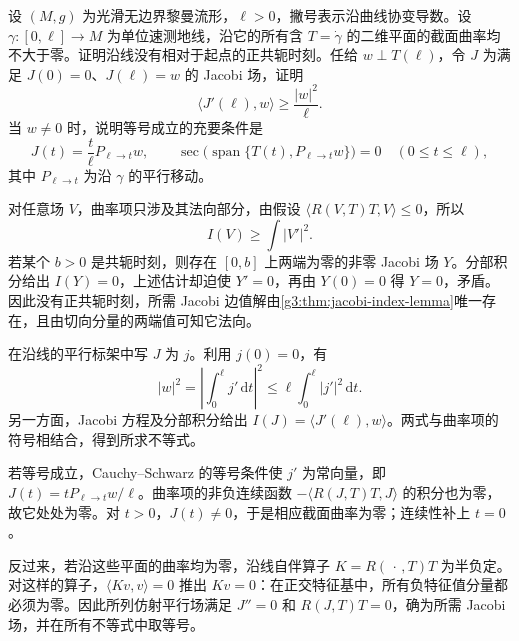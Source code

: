 \begin{exercise}\label{g3:ex:nonpositive-curvature-index-bound}
	设 \((M,g)\) 为光滑无边界黎曼流形，\(\ell>0\)，撇号表示沿曲线协变导数。设 \(\gamma:[0,\ell]\to M\) 为单位速测地线，沿它的所有含 \(T=\dot\gamma\) 的二维平面的截面曲率均不大于零。证明沿线没有相对于起点的正共轭时刻。任给 \(w\perp T(\ell)\)，令 \(J\) 为满足 \(J(0)=0\)、\(J(\ell)=w\) 的 Jacobi 场，证明
	\[
		\langle J'(\ell),w\rangle\ge\frac{|w|^2}{\ell}.
	\]
	当 \(w\ne0\) 时，说明等号成立的充要条件是
	\[
		J(t)=\frac t\ell P_{\ell\to t}w,
		\qquad
		\sec\bigl(\operatorname{span}\{T(t),P_{\ell\to t}w\}\bigr)=0
		\quad(0\le t\le\ell),
	\]
	其中 \(P_{\ell\to t}\) 为沿 \(\gamma\) 的平行移动。
\end{exercise}
\begin{solution}
	对任意场 \(V\)，曲率项只涉及其法向部分，由假设
	\(\langle R(V,T)T,V\rangle\le0\)，所以
	\[
		I(V)\ge\int|V'|^2.
	\]
	若某个 \(b>0\) 是共轭时刻，则存在 \([0,b]\) 上两端为零的非零 Jacobi 场 \(Y\)。分部积分给出 \(I(Y)=0\)，上述估计却迫使 \(Y'=0\)，再由 \(Y(0)=0\) 得 \(Y=0\)，矛盾。因此没有正共轭时刻，所需 Jacobi 边值解由\cref{g3:thm:jacobi-index-lemma}唯一存在，且由切向分量的两端值可知它法向。

	在沿线的平行标架中写 \(J\) 为 \(j\)。利用 \(j(0)=0\)，有
	\[
		|w|^2=\left|\int_0^\ell j'\,\mathrm dt\right|^2
		\le\ell\int_0^\ell|j'|^2\,\mathrm dt.
	\]
	另一方面，Jacobi 方程及分部积分给出
	\(I(J)=\langle J'(\ell),w\rangle\)。两式与曲率项的符号相结合，得到所求不等式。

	若等号成立，Cauchy--Schwarz 的等号条件使 \(j'\) 为常向量，即
	\(J(t)=tP_{\ell\to t}w/\ell\)。曲率项的非负连续函数
	\(-\langle R(J,T)T,J\rangle\) 的积分也为零，故它处处为零。对 \(t>0\)，\(J(t)\ne0\)，于是相应截面曲率为零；连续性补上 \(t=0\)。

	反过来，若沿这些平面的曲率均为零，沿线自伴算子 \(K=R(\,\cdot\,,T)T\) 为半负定。对这样的算子，\(\langle Kv,v\rangle=0\) 推出 \(Kv=0\)：在正交特征基中，所有负特征值分量都必须为零。因此所列仿射平行场满足 \(J''=0\) 和 \(R(J,T)T=0\)，确为所需 Jacobi 场，并在所有不等式中取等号。
\end{solution}

